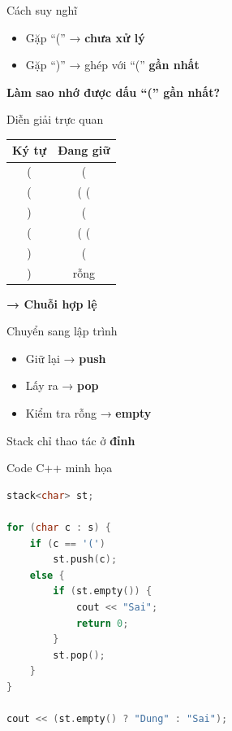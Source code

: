\documentclass[aspectratio=169]{beamer}
\begin{document}
\begin{frame}{Cách suy nghĩ}
\Large
\begin{itemize}
    \item Gặp ``('' → \textbf{chưa xử lý}
    \item Gặp ``)'' → ghép với ``('' \textbf{gần nhất}
\end{itemize}

\vspace{12pt}
\pause
\centering
\textbf{Làm sao nhớ được dấu ``('' gần nhất?}
\end{frame}

\begin{frame}{Diễn giải trực quan}
\Large
\begin{center}
\begin{tabular}{c|c}
Ký tự & Đang giữ \\
\hline
( & ( \\
( & ( ( \\
) & ( \\
( & ( ( \\
) & ( \\
) & rỗng \\
\end{tabular}
\end{center}

\vspace{10pt}
\centering
\textbf{→ Chuỗi hợp lệ}
\end{frame}

\begin{frame}{Chuyển sang lập trình}
\Large
\begin{itemize}
    \item Giữ lại → \textbf{push}
    \item Lấy ra → \textbf{pop}
    \item Kiểm tra rỗng → \textbf{empty}
\end{itemize}

\vspace{10pt}
\centering
Stack chỉ thao tác ở \textbf{đỉnh}
\end{frame}

\begin{frame}{Code C++ minh họa}
\begin{lstlisting}[language=C++]
stack<char> st;

for (char c : s) {
    if (c == '(')
        st.push(c);
    else {
        if (st.empty()) {
            cout << "Sai";
            return 0;
        }
        st.pop();
    }
}

cout << (st.empty() ? "Dung" : "Sai");
\end{lstlisting}
\end{frame}
\end{document}
